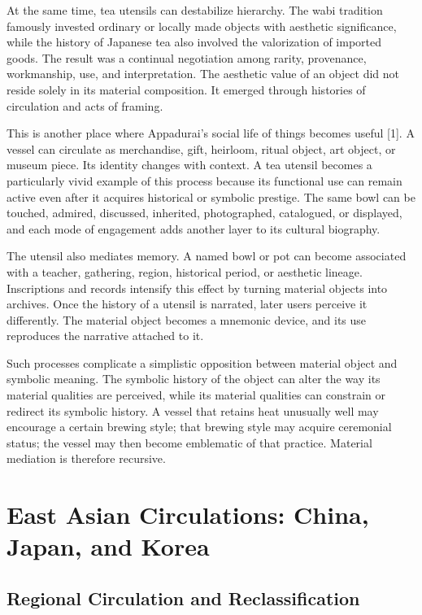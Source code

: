 \documentclass[11pt,a4paper]{article}
\begin{document}
At the same time, tea utensils can destabilize hierarchy. The wabi tradition famously invested ordinary or locally made objects with aesthetic significance, while the history of Japanese tea also involved the valorization of imported goods. The result was a continual negotiation among rarity, provenance, workmanship, use, and interpretation. The aesthetic value of an object did not reside solely in its material composition. It emerged through histories of circulation and acts of framing.

This is another place where Appadurai's social life of things becomes useful [1]. A vessel can circulate as merchandise, gift, heirloom, ritual object, art object, or museum piece. Its identity changes with context. A tea utensil becomes a particularly vivid example of this process because its functional use can remain active even after it acquires historical or symbolic prestige. The same bowl can be touched, admired, discussed, inherited, photographed, catalogued, or displayed, and each mode of engagement adds another layer to its cultural biography.

The utensil also mediates memory. A named bowl or pot can become associated with a teacher, gathering, region, historical period, or aesthetic lineage. Inscriptions and records intensify this effect by turning material objects into archives. Once the history of a utensil is narrated, later users perceive it differently. The material object becomes a mnemonic device, and its use reproduces the narrative attached to it.

Such processes complicate a simplistic opposition between material object and symbolic meaning. The symbolic history of the object can alter the way its material qualities are perceived, while its material qualities can constrain or redirect its symbolic history. A vessel that retains heat unusually well may encourage a certain brewing style; that brewing style may acquire ceremonial status; the vessel may then become emblematic of that practice. Material mediation is therefore recursive.

\section{East Asian Circulations: China, Japan, and Korea}

\subsection{Regional Circulation and Reclassification}
\end{document}
